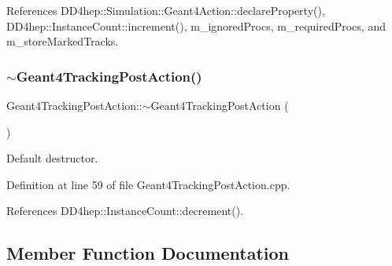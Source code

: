 References D\+D4hep\+::\+Simulation\+::\+Geant4\+Action\+::declare\+Property(), D\+D4hep\+::\+Instance\+Count\+::increment(), m\+\_\+ignored\+Procs, m\+\_\+required\+Procs, and m\+\_\+store\+Marked\+Tracks.

\hypertarget{class_d_d4hep_1_1_simulation_1_1_geant4_tracking_post_action_a25395b6df98baa403430c74dfe37b453}{}\label{class_d_d4hep_1_1_simulation_1_1_geant4_tracking_post_action_a25395b6df98baa403430c74dfe37b453} 
\subsubsection{\texorpdfstring{$\sim$\+Geant4\+Tracking\+Post\+Action()}{~Geant4TrackingPostAction()}}
{\footnotesize\ttfamily Geant4\+Tracking\+Post\+Action\+::$\sim$\+Geant4\+Tracking\+Post\+Action (\begin{DoxyParamCaption}{ }\end{DoxyParamCaption})\hspace{0.3cm}{\ttfamily [virtual]}}



Default destructor. 



Definition at line 59 of file Geant4\+Tracking\+Post\+Action.\+cpp.



References D\+D4hep\+::\+Instance\+Count\+::decrement().



\subsection{Member Function Documentation}
\hypertarget{class_d_d4hep_1_1_simulation_1_1_geant4_tracking_post_action_a3460d57b0bf474e1b83a3302056cf716}{}\label{class_d_d4hep_1_1_simulation_1_1_geant4_tracking_post_action_a3460d57b0bf474e1b83a3302056cf716} 
